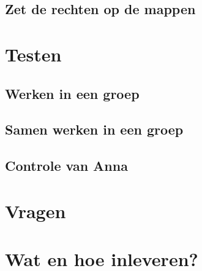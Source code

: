 \documentclass[a4paper,12pt,twoside,openright,titlepage]{article}
\begin{document}
\subsection{Zet de rechten op de mappen}


\section{Testen}
\subsection{Werken in een groep}

\subsection{Samen werken in een groep}

\subsection{Controle van Anna}


\section{Vragen}


\section{Wat en hoe inleveren?}


\printindex
\end{document}

